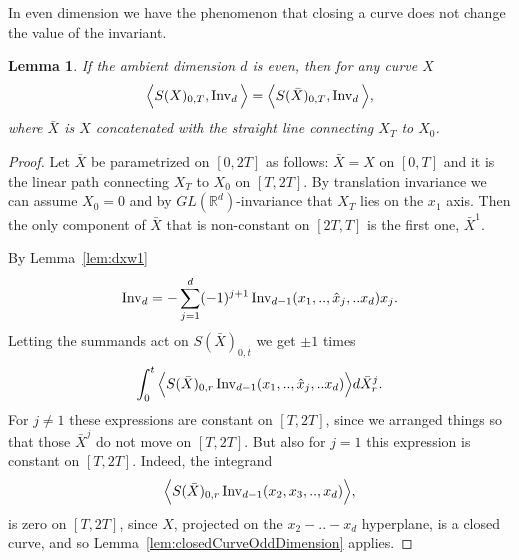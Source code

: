 \documentclass{scrartcl}
\theoremstyle{plain}
\newtheorem{lemma}[theorem]{Lemma}
\theoremstyle{definition}
\newcommand{\R}{\mathbb{R}}
\newcommand{\1}[1]{1_{\{#1\}}}
\newcommand{\ds}{d} %
\begin{document}
In even dimension we have the phenomenon
that closing a curve does not change the value of the invariant.
\begin{lemma}
  \label{lem:lastPoint}
  If the ambient dimension $\ds$ is even, then for any curve $X$
  \begin{align*}
    \Big\langle S(X)_{0,T}, \firstInvariant\ds \Big\rangle
    =
    \Big\langle S(\bar X)_{0,T}, \firstInvariant\ds \Big\rangle,
  \end{align*}
  where $\bar X$ is $X$ concatenated with the straight line connecting $X_T$ to $X_0$.
\end{lemma}
\begin{proof}
  Let $\bar X$ be parametrized on $[0,2T]$ as follows: $\bar X = X$ on $[0,T]$
  and it is the linear path connecting $X_T$ to $X_0$ on $[T,2T]$.
  By translation invariance we can assume $X_0 = 0$ and by $GL(\R^\ds)$-invariance that $X_T$ lies on the $x_1$ axis.
  Then the only component of $\bar X$ that is non-constant on $[2T,T]$ is the first one, $\bar X^1$.

  By Lemma~\ref{lem:dxw1}
  \begin{align*}
    \firstInvariant{\ds}
    =
    -
    \sum_{j=1}^\ds
    (-1)^{j+1}
    \firstInvariant{\ds-1}(x_1, .., \hat x_j, .. x_d) x_j.
  \end{align*}
  Letting the summands act on $S(\bar X)_{0,t}$ we get $\pm 1$ times
  \begin{align*}
    \int_0^t \Big\langle S(\bar X)_{0,r} \firstInvariant{\ds-1}(x_1, .., \hat x_j, .. x_d) \Big\rangle d\bar X^j_r.
  \end{align*}
  For $j\not=1$ these expressions are constant on $[T,2T]$, since we arranged things so that those
  $\bar X^j$ do not move on $[T,2T]$.
  But also for $j=1$ this expression is constant on $[T,2T]$.
  Indeed, the integrand 
  \begin{align*}
    \Big\langle S(\bar X)_{0,r} \firstInvariant{\ds-1}(x_2, x_3, .., x_d) \Big\rangle,
  \end{align*}
  is zero on $[T,2T]$, since $X$, projected on the $x_2-..-x_d$ hyperplane, is a closed curve,
  and so Lemma~\ref{lem:closedCurveOddDimension} applies.
\end{proof}
\end{document}
